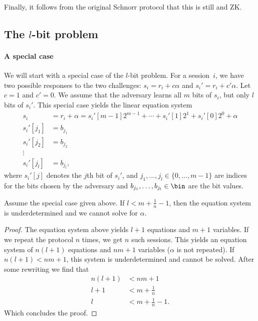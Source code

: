 Finally, it follows from the original Schnorr protocol that this is still  and \ac{ZK}.

\subsection{The \(l\)-bit problem}

\paragraph*{A special case}

We will start with a special case of the \(l\)-bit problem.
For a session~\(i\), we have two possible responses to the two challenges:
\(s_i = r_i + c\alpha\) and \(s_i' = r_i + c'\alpha\).
Let \(c = 1\) and \(c' = 0\).
We assume that the adversary learns all \(m\) bits of \(s_i\), but only \(l\) 
bits of \(s_i'\).
This special case yields the linear equation system
\begin{align*}
  s_i &= r_i + \alpha
  = s_i'[m-1] 2^{m-1} + \dotsb + s_i'[1] 2^1 + s_i'[0] 2^0 + \alpha \\
  s_i'[j_1] &= b_{j_1} \\
  s_i'[j_2] &= b_{j_2} \\
  \vdots \\
  s_i'[j_l] &= b_{j_l},
\end{align*}
where \(s_i'[j]\) denotes the \(j\)th bit of \(s_i'\), and \(j_1, \dotsc, 
j_l\in \{0, \dotsc, m-1\}\) are indices for the bits chosen by the adversary 
and \(b_{j_1}, \dotsc, b_{j_l}\in \bin\) are the bit values.

\begin{lemma}
  Assume the special case given above.
  If \(l < m+\frac{1}{n}-1\), then the equation system is underdetermined and 
  we cannot solve for \(\alpha\).
\end{lemma}
\begin{proof}
  The equation system above yields \(l+1\) equations and \(m+1\) variables.
  If we repeat the protocol \(n\) times, we get \(n\) such sessions.
  This yields an equation system of \(n(l+1)\) equations and \(nm+1\) variables 
  (\(\alpha\) is not repeated).
  If \(n(l+1) < nm+1\), this system is underdetermined and cannot be solved.
  After some rewriting we find that
  \begin{align*}
    n(l+1) &< nm+1 \\
    l+1 &< m + \frac{1}{n} \\
    l &< m + \frac{1}{n} -1.
  \end{align*}
  Which concludes the proof.
\end{proof}

